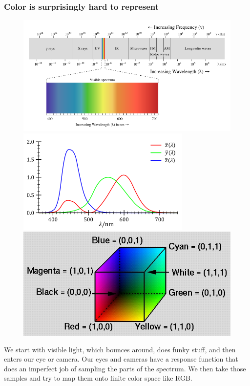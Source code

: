 \documentclass{beamer}
\begin{document}
\begin{frame}
\frametitle{Color is surprisingly hard to represent}
 \begin{figure}
     \includegraphics[width=0.3\linewidth]{visiblelight.png}
     \quad
     \includegraphics[width=0.3\linewidth]{theeye.png}
     \quad
     \includegraphics[width=0.3\linewidth]{RGB_cube_color.jpg}
 \end{figure}
We start with visible light, which bounces around, does funky stuff, and then enters our
eye or camera. Our eyes and cameras have a response function that does
an imperfect job of sampling the parts of the spectrum. We then take
those samples and try to map them onto finite color space like RGB. 
\end{frame}
\end{document}
